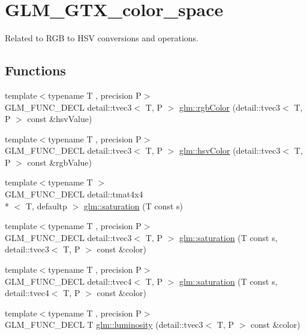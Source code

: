 \hypertarget{group__gtx__color__space}{\section{G\-L\-M\-\_\-\-G\-T\-X\-\_\-color\-\_\-space}
\label{group__gtx__color__space}
}


Related to R\-G\-B to H\-S\-V conversions and operations.  


\subsection*{Functions}
\begin{DoxyCompactItemize}
\item 
{\footnotesize template$<$typename T , precision P$>$ }\\G\-L\-M\-\_\-\-F\-U\-N\-C\-\_\-\-D\-E\-C\-L detail\-::tvec3$<$ T, P $>$ \hyperlink{group__gtx__color__space_gafe29cc37c2675aee66c9f9ae3e5e7294}{glm\-::rgb\-Color} (detail\-::tvec3$<$ T, P $>$ const \&hsv\-Value)
\item 
{\footnotesize template$<$typename T , precision P$>$ }\\G\-L\-M\-\_\-\-F\-U\-N\-C\-\_\-\-D\-E\-C\-L detail\-::tvec3$<$ T, P $>$ \hyperlink{group__gtx__color__space_ga9d3d99c06af10403d317dec0cb655090}{glm\-::hsv\-Color} (detail\-::tvec3$<$ T, P $>$ const \&rgb\-Value)
\item 
{\footnotesize template$<$typename T $>$ }\\G\-L\-M\-\_\-\-F\-U\-N\-C\-\_\-\-D\-E\-C\-L detail\-::tmat4x4\\*
$<$ T, defaultp $>$ \hyperlink{group__gtx__color__space_ga444bcc8582eaa894acf405762ba2a5ff}{glm\-::saturation} (T const s)
\item 
{\footnotesize template$<$typename T , precision P$>$ }\\G\-L\-M\-\_\-\-F\-U\-N\-C\-\_\-\-D\-E\-C\-L detail\-::tvec3$<$ T, P $>$ \hyperlink{group__gtx__color__space_ga1a6fe89b5effcc718b5f49de5bb50fad}{glm\-::saturation} (T const s, detail\-::tvec3$<$ T, P $>$ const \&color)
\item 
{\footnotesize template$<$typename T , precision P$>$ }\\G\-L\-M\-\_\-\-F\-U\-N\-C\-\_\-\-D\-E\-C\-L detail\-::tvec4$<$ T, P $>$ \hyperlink{group__gtx__color__space_ga42cc34c45ab66e010c629106952c8bdd}{glm\-::saturation} (T const s, detail\-::tvec4$<$ T, P $>$ const \&color)
\item 
{\footnotesize template$<$typename T , precision P$>$ }\\G\-L\-M\-\_\-\-F\-U\-N\-C\-\_\-\-D\-E\-C\-L T \hyperlink{group__gtx__color__space_ga3fb6710bbbf4f3e2303b06946e9cf00c}{glm\-::luminosity} (detail\-::tvec3$<$ T, P $>$ const \&color)
\end{DoxyCompactItemize}


